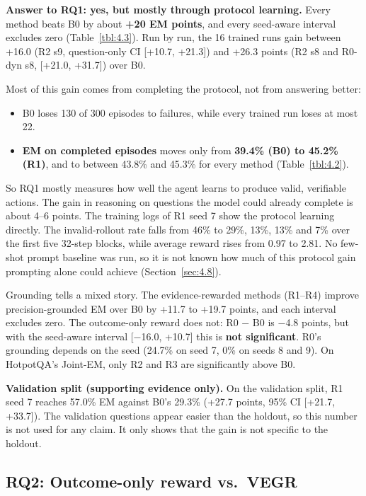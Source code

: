 \textbf{Answer to RQ1: yes, but mostly through protocol learning.} Every
method beats B0 by about \textbf{+20 EM points}, and every seed-aware
interval excludes zero (Table~\ref{tbl:4.3}). Run by run, the 16 trained
runs gain between +16.0 (R2 s9, question-only CI {[}+10.7, +21.3{]}) and
+26.3 points (R2 s8 and R0-dyn s8, {[}+21.0, +31.7{]}) over B0.

Most of this gain comes from completing the protocol, not from answering
better:

\begin{itemize}
\tightlist
\item
  B0 loses 130 of 300 episodes to failures, while every trained run
  loses at most 22.
\item
  \textbf{EM on completed episodes} moves only from \textbf{39.4\% (B0)
  to 45.2\% (R1)}, and to between 43.8\% and 45.3\% for every method
  (Table~\ref{tbl:4.2}).
\end{itemize}

So RQ1 mostly measures how well the agent learns to produce valid,
verifiable actions. The gain in reasoning on questions the model could
already complete is about 4--6 points. The training logs of R1 seed 7
show the protocol learning directly. The invalid-rollout rate falls from
46\% to 29\%, 13\%, 13\% and 7\% over the first five 32-step blocks,
while average reward rises from 0.97 to 2.81. No few-shot prompt
baseline was run, so it is not known how much of this protocol gain
prompting alone could achieve (Section~\ref{sec:4.8}).

Grounding tells a mixed story. The evidence-rewarded methods (R1--R4)
improve precision-grounded EM over B0 by +11.7 to +19.7 points, and each
interval excludes zero. The outcome-only reward does not: R0 − B0 is
−4.8 points, but with the seed-aware interval {[}−16.0, +10.7{]} this is
\textbf{not significant}. R0's grounding depends on the seed (24.7\% on
seed 7, 0\% on seeds 8 and 9). On HotpotQA's Joint-EM, only R2 and R3
are significantly above B0.

\textbf{Validation split (supporting evidence only).} On the validation
split, R1 seed 7 reaches 57.0\% EM against B0's 29.3\% (+27.7 points,
95\% CI {[}+21.7, +33.7{]}). The validation questions appear easier than
the holdout, so this number is not used for any claim. It only shows
that the gain is not specific to the holdout.

\subsection{RQ2: Outcome-only reward vs.~VEGR}\label{sec:4.4}

